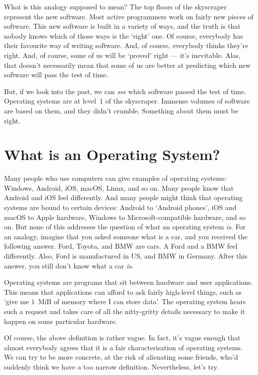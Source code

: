 What is this analogy supposed to mean?
The top floors of the skyscraper represent the new software.
Most active programmers work on fairly new pieces of software.
This new software is built in a variety of ways,
  and the truth is that nobody knows which of those ways is the `right' one.
Of course, everybody has their favourite way of writing software.
And, of course, everybody thinks they're right.
And, of course, some of us will be `proved' right --- it's inevitable.
Alas, that doesn't necessarily mean that some of us are better at predicting
  which new software will pass the test of time.

But, if we look into the past, we can \emph{see} which software passed the test of time.
Operating systems are at level~1 of the skyscraper.
Immense volumes of software are based on them, and they didn't crumble.
Something about them must be right.

\section{What is an Operating System?}

Many people who use computers can give examples of operating systems:
  Windows, Android, iOS, macOS, Linux, and so on.
Many people know that Android and iOS feel differently.
And many people might think that operating systems are bound to certain devices:
  Android to `Android phones',
  iOS and macOS to Apple hardware,
  Windows to Microsoft-compatible hardware,
  and so on.
But none of this addresses the question of what an operating system \emph{is}.
For an analogy,
  imagine that you asked someone what is a car,
  and you received the following answer.
Ford, Toyota, and BMW are cars.
A Ford and a BMW feel differently.
Also, Ford is manufactured in US, and BMW in Germany.
After this answer,
  you still don't know what a car \emph{is}.

\medskip

Operating systems are programs that sit between hardware and user applications.
This means that applications can afford to ask fairly high-level things,
  such as `give me $1$~MiB of memory where I can store data'.
The operating system hears such a request and takes care of all the nitty-gritty details
  necessary to make it happen on some particular hardware.

Of course, the above definition is rather vague.
In fact,
  it's vague enough that almost everybody agrees
  that it is a fair characterisation of operating systems.
We can try to be more concrete, at the risk of alienating some friends,
  who'd suddenly think we have a too narrow definition.
Nevertheless, let's try.

